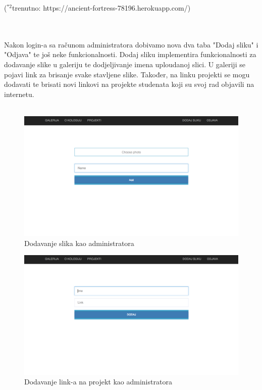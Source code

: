 \documentclass[]{article}
\begin{document}
\begin{footnotesize}
	($^{*2}$trenutno: https://ancient-fortress-78196.herokuapp.com/)
\end{footnotesize}
\\
\\
Nakon login-a sa računom administratora dobivamo nova dva taba "Dodaj sliku" i "Odjava" te još neke funkcionalnosti. Dodaj sliku implementira funkcionalnosti za dodavanje slike u galeriju te dodjeljivanje imena uploudanoj slici. U galeriji se pojavi link za brisanje svake stavljene slike. Također, na linku projekti se mogu dodavati te brisati novi linkovi na projekte studenata koji su svoj rad objavili na internetu.
\\
\\
\begin{figure}[h]
	\centering
	\includegraphics[scale=0.22]{dodaj-sliku}
	\caption{Dodavanje slika kao administratora}
	\label{fig:mesh1}
\end{figure}

\begin{figure}[h]
	\centering
	\includegraphics[scale=0.22]{dodaj-projekt}
	\caption{Dodavanje link-a na projekt kao administratora}
	\label{fig:mesh1}
\end{figure}
\end{document}
